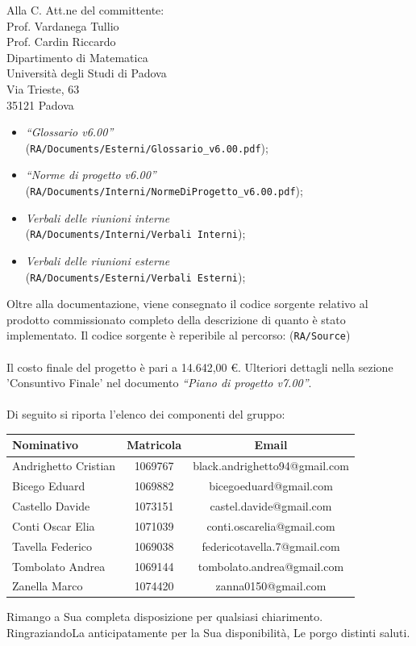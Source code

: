 \documentclass[a4paper,12pt]{letteracdp}
\begin{document}
\begin{letter}{
		Alla C. Att.ne del committente: \\
		Prof. Vardanega Tullio \\
		Prof. Cardin Riccardo \\
		Dipartimento di Matematica \\
		Università degli Studi di Padova \\
		Via Trieste, 63 \\
		35121 Padova}
\begin{itemize}
	\item \textit{“Glossario v6.00”} \\(\texttt{RA/Documents/Esterni/Glossario\_v6.00.pdf});
	
	\item \textit{“Norme di progetto v6.00”} \\(\texttt{RA/Documents/Interni/NormeDiProgetto\_v6.00.pdf});

	\item \textit{Verbali delle riunioni interne}	\\(\texttt{RA/Documents/Interni/Verbali Interni});
	
	\item \textit{Verbali delle riunioni esterne}	\\(\texttt{RA/Documents/Esterni/Verbali Esterni});
		
\end{itemize}

Oltre alla documentazione, viene consegnato il codice sorgente relativo al prodotto commissionato completo della descrizione di quanto è stato implementato. Il codice sorgente è reperibile al percorso: (\texttt{RA/Source})\\ \\
Il costo finale del progetto è pari a 14.642,00 \euro. Ulteriori dettagli nella sezione 'Consuntivo Finale' nel documento \textit{“Piano di progetto v7.00”}.\\ \\
Di seguito si riporta l'elenco dei componenti del gruppo:

\begin{center}
		\begin{tabular}{l c c}
			\toprule
			\textbf{Nominativo} & \textbf{Matricola} & \textbf{Email} \\
			\midrule
			Andrighetto Cristian & 1069767 & black.andrighetto94@gmail.com \\
			Bicego Eduard & 1069882 & bicegoeduard@gmail.com  \\
			Castello Davide	& 1073151 &	 castel.davide@gmail.com\\
			Conti Oscar Elia & 1071039 & conti.oscarelia@gmail.com \\
			Tavella Federico & 1069038 & federicotavella.7@gmail.com\\
			Tombolato Andrea & 1069144 & tombolato.andrea@gmail.com	 \\
			Zanella Marco & 1074420 & zanna0150@gmail.com \\
			\bottomrule
		\end{tabular}
\end{center}
		
		\closing{Rimango a Sua completa disposizione per qualsiasi chiarimento. \\
		RingraziandoLa anticipatamente per la Sua disponibilità, Le porgo distinti saluti.}
		
	\end{letter}
\end{document}
